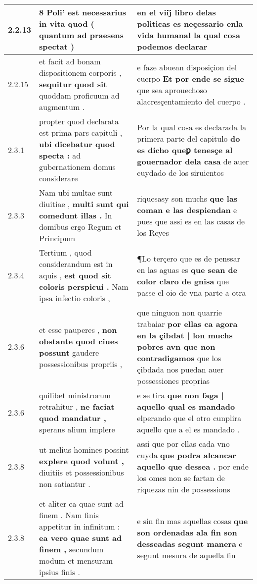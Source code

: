 \begin{tabular}{|p{1cm}|p{6.5cm}|p{6.5cm}|}
2.2.13 & 8 Poli’ \textbf{ est necessarius in vita quod } ( quantum ad praesens spectat ) & en el viij̊ libro delas politicas \textbf{ es neçessario enla vida } humanal la qual cosa podemos declarar \\\hline
2.2.15 & et facit ad bonam dispositionem corporis , \textbf{ sequitur quod sit } quoddam proficuum ad augmentum . & e faze abuean disposiçion del cuerpo \textbf{ Et por ende se sigue } que sea aprouechoso alacresçentamiento del cuerpo . \\\hline
2.3.1 & propter quod declarata est prima pars capituli , \textbf{ ubi dicebatur quod specta : } ad gubernationem domus considerare & Por la qual cosa es declarada la primera parte del capitulo \textbf{ do es dicho queꝑ tenesçe al gouernador dela casa } de auer cuydado de los siruientos \\\hline
2.3.3 & Nam ubi multae sunt diuitiae , \textbf{ multi sunt qui comedunt illas . } In domibus ergo Regum et Principum & riquesasy son muchs \textbf{ que las coman e las despiendan } e pues que assi es en las casas de los Reyes \\\hline
2.3.4 & Tertium , quod considerandum est in aquis , \textbf{ est quod sit coloris perspicui . } Nam ipsa infectio coloris , & ¶Lo terçero que es de penssar en las aguas es \textbf{ que sean de color claro de gnisa } que passe el oio de vna parte a otra \\\hline
2.3.6 & et esse pauperes , \textbf{ non obstante quod ciues possunt } gaudere possessionibus propriis , & que ninguon non quarrie trabaiar \textbf{ por ellas ca agora en la çibdat | lon muchs pobres avn que non contradigamos } que los çibdada nos puedan auer possessiones proprias \\\hline
2.3.6 & quilibet ministrorum retrahitur , \textbf{ ne faciat quod mandatur , } sperans alium implere & e se tira \textbf{ que non faga | aquello qual es mandado } elperando que el otro cunplira aquello que a el es mandado . \\\hline
2.3.8 & ut melius homines possint \textbf{ explere quod volunt , } diuitiis et possessionibus non satiantur . & assi que por ellas cada vno cuyda \textbf{ que podra alcancar aquello que dessea . } por ende los omes non se fartan de riquezas nin de possessions \\\hline
2.3.8 & et aliter ea quae sunt ad finem . Nam finis appetitur in infinitum : \textbf{ ea vero quae sunt ad finem , } secundum modum et mensuram ipsius finis . & e sin fin mas aquellas cosas \textbf{ que son ordenadas ala fin son desseadas segunt manera } e segunt mesura de aquella fin \\\hline

\end{tabular}
